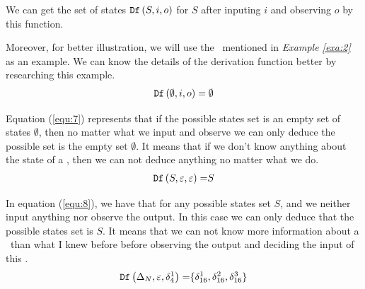  
 We can get the set of states ${\tt Df}\left(S, i, o\right)$ for $S$ after inputing $i$ and observing $o$ by this function. 
\begin{example}
 Moreover, for better illustration, we will use the \BCN\ mentioned in {\em Example \ref{exa:2}} as an example. We can know the details of the derivation function better by researching this example.
\begin{equation}
\begin{split}
{\tt Df}\left(\emptyset,i,o\right)=\emptyset\\
\end{split}
\label{equ:7}
\end{equation}

Equation (\ref{equ:7}) represents that if the possible states set is an empty set of states $\emptyset$, then no matter what we input and observe we can only deduce the possible set is the empty set $\emptyset$. It means that if we don't know anything about the state of a \BCN, then we can not deduce anything no matter what we do.
\begin{equation}
\begin{split}
{\tt Df}\left(S,\varepsilon,\varepsilon\right)=&S\\
\end{split}
\label{equ:8}
\end{equation}

 In equation (\ref{equ:8}), we have that for any possible states set $S$, and we neither input anything nor observe the output. In this case we can only deduce that the possible states set is $S$. It means that we can not know more information about a \BCN\ than what I knew before before observing the output and deciding the input of this \BCN.
\begin{equation}
\begin{split}
{\tt Df}\left(\Delta_N,\varepsilon,\delta_4^1\right)=&\{\delta_{16}^1,\delta_{16}^2,\delta_{16}^3\}\\
\end{split}
\label{equ:9}
\end{equation}
 

\end{example}
